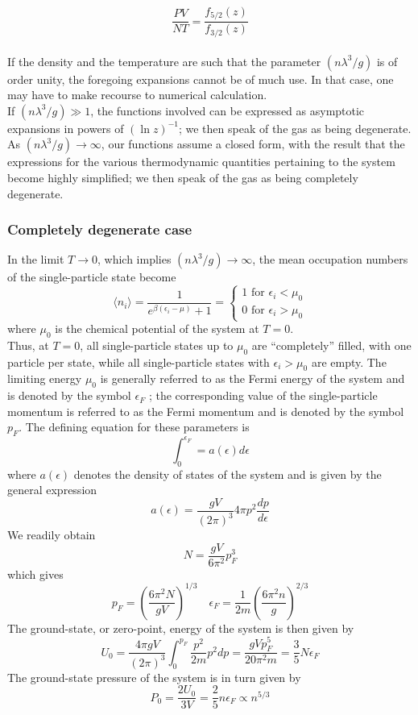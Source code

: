 \[\frac{PV}{NT} = \frac{f_{5/2}(z)}{f_{3/2}(z)}\]
\\
If the density and the temperature are such that the parameter $(n\lambda^3/g)$ is of order unity, the foregoing expansions cannot be of much use. In that case, one may have to make recourse to numerical calculation.
\\
If $(n\lambda^3/g) \gg 1$, the functions involved can be expressed as asymptotic expansions in powers of $(\ln z)^{-1}$; we then speak of the gas as being degenerate.
\\
As $(n\lambda^3/g) \to \infty$, our functions assume a closed form, with the result that the expressions for the various thermodynamic quantities pertaining to the system become highly simplified; we then speak of the gas as being completely degenerate.

\subsubsection{Completely degenerate case}
In the limit $T \to 0$, which implies $(n\lambda^3/g) \to \infty$, the mean occupation numbers of the single-particle state become
\[\langle n_i \rangle = \frac{1}{e^{\beta(\epsilon_i - \mu)} + 1} = \begin{cases}1 \mbox{ for } \epsilon_i < \mu_0 \\   0 \mbox{ for } \epsilon_i > \mu_0 \end{cases}\]
where $\mu_0$ is the chemical potential of the system at $T = 0$.
\\
Thus, at $T = 0$, all single-particle states up to $\mu_0$ are ``completely'' filled, with one particle per state, while all single-particle states with $\epsilon_i > \mu_0$ are empty. 
The limiting energy $\mu_0$ is generally referred to as the Fermi energy of the system and is denoted by the symbol $\epsilon_F$ ; the corresponding value of the single-particle momentum is referred to as the Fermi momentum and is denoted by the symbol $p_F$. The defining equation for these parameters is
\[\int_0^{\epsilon_F} = a(\epsilon)d\epsilon\]
where $a(\epsilon)$ denotes the density of states of the system and is given by the general expression
\[a(\epsilon) = \frac{gV}{(2\pi)^3} 4\pi p^2 \frac{dp}{d\epsilon}\]
We readily obtain
\[N = \frac{gV}{6\pi^2} p_F^3\]
which gives
\[p_F = \left( \frac{6\pi^2N}{gV} \right)^{1/3} \quad \epsilon_F = \frac{1}{2m}\left( \frac{6\pi^2n}{g} \right)^{2/3}\]
The ground-state, or zero-point, energy of the system is then given by
\[U_0 = \frac{4\pi gV}{(2\pi)^3} \int_0^{p_F} \frac{p^2}{2m} p^2 dp = \frac{gVp_F^5}{20\pi^2m} = \frac{3}{5}N\epsilon_F\]
The ground-state pressure of the system is in turn given by
\[P_0 = \frac{2U_0}{3V} = \frac{2}{5}n\epsilon_F \propto n^{5/3}\]

